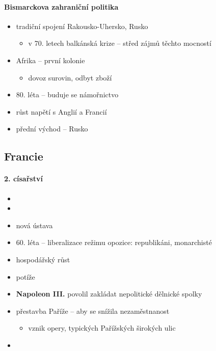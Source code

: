 \paragraph{Bismarckova zahraniční politika}
\begin{itemize}
\item tradiční spojení Rakousko-Uhersko, Rusko
	\begin{itemize}
	\item v 70. letech balkánská krize -- střed zájmů těchto mocností
	\end{itemize}
\item Afrika -- první kolonie
	\begin{itemize}
	\item dovoz surovin, odbyt zboží
	\end{itemize}
\item 80. léta -- buduje se námořnictvo
\item růst napětí s Anglií a Francií
\item přední východ -- Rusko
\end{itemize}

\subsection{Francie}
\paragraph{2. císařství}
\begin{itemize}
\item {}
\item {}
\item nová ústava
\item 60. léta -- liberalizace režimu \ra opozice: republikáni, monarchisté
\item hospodářský růst
\item {} \ra potíže
\item \textbf{Napoleon III.} povolil zakládat nepolitické dělnické spolky
\item přestavba Paříže -- aby se snížila nezaměstnanost
	\begin{itemize}
	\item vznik opery, typických Pařížských širokých ulic
	\end{itemize}
\item {}
\end{itemize}

